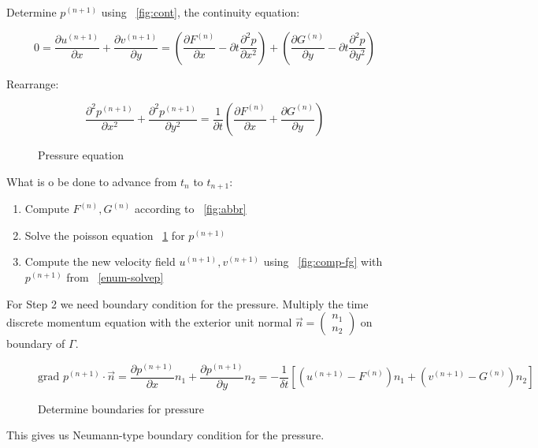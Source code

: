 Determine $p^{(n+1)}$ using ~\ref{fig:cont}, the continuity equation:

\[ 0 = \frac{\partial u^{(n+1)}}{\partial x} + \frac{\partial v^{(n+1)}}{\partial y} = \left( \frac{\partial F^{(n)}}{\partial x} - \partial t \frac{\partial^2 p}{\partial x^2} \right) + \left( \frac{\partial G^{(n)}}{\partial y} - \partial t \frac{\partial^2 p}{\partial y^2} \right)  \]

Rearrange:
\begin{figure}[H]
	\centering
   \[ \frac{\partial^2 p^{(n+1)}}{\partial x^2} + \frac{\partial^2 p^{(n+1)}}{\partial y^2} = \frac{1}{\partial t} \left( \frac{\partial F^{(n)}}{\partial x} + \frac{\partial G^{(n)}}{\partial y} \right) \]
	\renewcommand{\thefigure}{3.32}
	\caption{Pressure equation}
	\label{fig:pressure-eq}
\end{figure}

What is o be done to advance from $t_n$ to $t_{n+1}$:
\begin{enumerate}[label=Step \arabic*]
   \item Compute $F^{(n)}, G^{(n)}$ according to  ~\ref{fig:abbr}
   \item Solve the poisson equation ~\ref{fig:pressure-eq} for $p^{(n+1)}$ \label{enum-solvep}
      \item Compute the new velocity field $u^{(n+1)}, v^{(n+1)}$ using ~\ref{fig:comp-fg} with $p^{(n+1)}$ from ~\ref{enum-solvep}
\end{enumerate}

For Step 2 we need boundary condition for the pressure. Multiply the time discrete momentum equation with the exterior unit normal $\vec{n} = \begin{pmatrix}n_1\\n_2\end{pmatrix}$ on boundary of $\Gamma$.

\begin{figure}[H]
	\centering
   \[ \text{grad } p^{(n+1)} \cdot \vec{n} = \frac{\partial p^{(n+1)}}{\partial x} n_1 + \frac{\partial p^{(n+1)}}{\partial y} n_2 = -\frac{1}{\delta t} \left[ (u^{(n+1)} - F^{(n)}) n_1 + (v^{(n+1)} - G^{(n)})n_2 \right] \]
	\renewcommand{\thefigure}{3.33}
	\caption{Determine boundaries for pressure}
	\label{fig:pressure-boundaries}
\end{figure}

This gives us Neumann-type boundary condition for the pressure.

